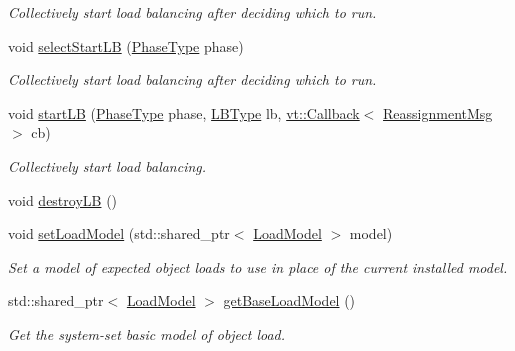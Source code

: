 \begin{DoxyCompactItemize}
\begin{DoxyCompactList}\small\item\em Collectively start load balancing after deciding which to run. \end{DoxyCompactList}\item 
void \hyperlink{structvt_1_1vrt_1_1collection_1_1balance_1_1_l_b_manager_aa21017c4513b87dccff2c3f0b12b00b4}{select\+Start\+LB} (\hyperlink{namespacevt_a46ce6733d5cdbd735d561b7b4029f6d7}{Phase\+Type} phase)
\begin{DoxyCompactList}\small\item\em Collectively start load balancing after deciding which to run. \end{DoxyCompactList}\item 
void \hyperlink{structvt_1_1vrt_1_1collection_1_1balance_1_1_l_b_manager_a9d93ed4b02b05ff1ed993ce2c6e92356}{start\+LB} (\hyperlink{namespacevt_a46ce6733d5cdbd735d561b7b4029f6d7}{Phase\+Type} phase, \hyperlink{namespacevt_1_1vrt_1_1collection_1_1balance_ac4f99693509affcc67db182d4aad9b5c}{L\+B\+Type} lb, \hyperlink{namespacevt_a36db99df4c973d48b1118a293fff533f}{vt\+::\+Callback}$<$ \hyperlink{structvt_1_1vrt_1_1collection_1_1balance_1_1_reassignment_msg}{Reassignment\+Msg} $>$ cb)
\begin{DoxyCompactList}\small\item\em Collectively start load balancing. \end{DoxyCompactList}\item 
void \hyperlink{structvt_1_1vrt_1_1collection_1_1balance_1_1_l_b_manager_ab66d9e597749a0a798278469f6afbd5b}{destroy\+LB} ()
\item 
void \hyperlink{structvt_1_1vrt_1_1collection_1_1balance_1_1_l_b_manager_a57813a70e0395907021a14c9e2bc1916}{set\+Load\+Model} (std\+::shared\+\_\+ptr$<$ \hyperlink{structvt_1_1vrt_1_1collection_1_1balance_1_1_load_model}{Load\+Model} $>$ model)
\begin{DoxyCompactList}\small\item\em Set a model of expected object loads to use in place of the current installed model. \end{DoxyCompactList}\item 
std\+::shared\+\_\+ptr$<$ \hyperlink{structvt_1_1vrt_1_1collection_1_1balance_1_1_load_model}{Load\+Model} $>$ \hyperlink{structvt_1_1vrt_1_1collection_1_1balance_1_1_l_b_manager_a9822187c2745a7b3b9c4a5929f8e3cc4}{get\+Base\+Load\+Model} ()
\begin{DoxyCompactList}\small\item\em Get the system-\/set basic model of object load. \end{DoxyCompactList}\item 

\end{DoxyCompactItemize}
